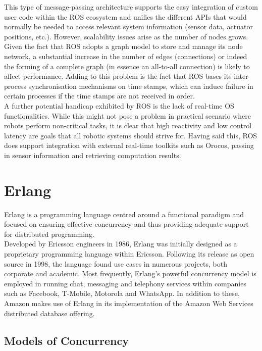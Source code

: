 \documentclass{l4proj}
\begin{document}
This type of message-passing architecture supports the easy integration of custom user code within the ROS ecosystem and unifies the different APIs that would normally be needed to access relevant system information (sensor data, actuator positions, etc.). However, scalability issues arise as the number of nodes grows. Given the fact that ROS adopts a graph model to store and manage its node network, a substantial increase in the number of edges (connections) or indeed the forming of a complete graph (in essence an all-to-all connection) is likely to affect performance.
Adding to this problem is the fact that ROS bases its inter-process synchronisation mechanisms on time stamps, which can induce failure in certain processes if the time stamps are not received in order.\\

A further potential handicap exhibited by ROS is the lack of real-time OS functionalities. While this might not pose a problem in practical scenario where robots perform non-critical tasks, it is clear that high reactivity and low control latency are goals that all robotic systems should strive for.
Having said this, ROS does support integration with external real-time toolkits such as Orocos, passing in sensor information and retrieving computation results.\\

\section{Erlang}

Erlang is a programming language centred around a functional paradigm and focused on ensuring effective concurrency and thus providing adequate support for distributed programming.\\

Developed by Ericsson engineers in 1986, Erlang was initially designed as a proprietary programming language within Ericsson. Following its release as open source in 1998, the language found use cases in numerous projects, both corporate and academic.
Most frequently, Erlang's powerful concurrency model is employed in running chat, messaging and telephony services within companies such as Facebook, T-Mobile, Motorola and WhatsApp. In addition to these, Amazon makes use of Erlang in its implementation of the Amazon Web Services distributed database offering.\\

\subsection{Models of Concurrency}
\end{document}
